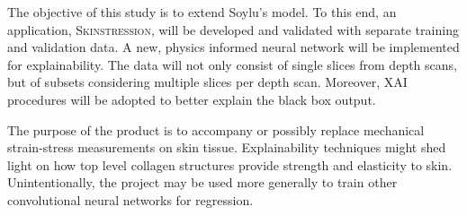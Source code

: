 The objective of this study is to extend Soylu's model.
To this end, an application, \textsc{Skinstression}, will be developed and validated with separate training and validation data.
A new, physics informed neural network will be implemented for explainability.
The data will not only consist of single slices from depth scans, but of subsets considering multiple slices per depth scan.
Moreover, XAI procedures will be adopted to better explain the black box output.

The purpose of the product is to accompany or possibly replace mechanical strain-stress measurements on skin tissue.
Explainability techniques might shed light on how top level collagen structures provide strength and elasticity to skin.
Unintentionally, the project may be used more generally to train other convolutional neural networks for regression.
